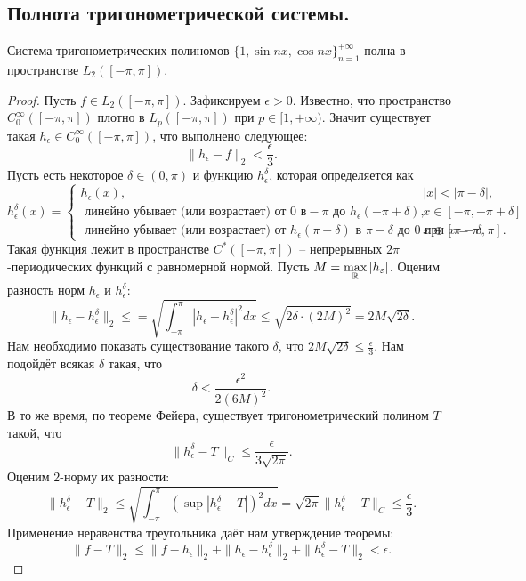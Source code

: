 \subsection{Полнота тригонометрической системы.}
\begin{theorem}
    Система тригонометрических полиномов $\{1, \sin nx, \cos nx\}_{n = 1}^{+\infty}$ полна в пространстве $L_2([-\pi, \pi])$.
\end{theorem}
\begin{proof}
    Пусть $f \in L_2([-\pi, \pi])$.
    Зафиксируем $\epsilon > 0$.
    Известно, что пространство $C_0^\infty([-\pi, \pi])$ плотно в $L_p([-\pi, \pi])$ при $p \in [1, +\infty)$.
    Значит существует такая $h_\epsilon \in C_0^\infty([-\pi, \pi])$, что выполнено следующее:
    \[
        \|h_\epsilon - f\|_2 < \frac{\epsilon}{3}.
    \]
    Пусть есть некоторое $\delta \in (0, \pi)$ и функцию $h_\epsilon^\delta$, которая определяется как
    \[
        h_{\epsilon}^{\delta}(x) =
        \begin{cases}
            h_{\epsilon}(x), & |x| < |\pi - \delta|, \\
            \text{ линейно убывает (или возрастает) от 0 в} -\pi \text{ до } h_\epsilon(-\pi + \delta), & x \in [-\pi, -\pi + \delta] \\
            \text{ линейно убывает (или возрастает) от } h_\epsilon(\pi - \delta) \text{ в } \pi - \delta \text{ до } 0 \text{ при } x = \pi, & x \in [\pi - \delta, \pi].
        \end{cases}
    \]
    Такая функция лежит в пространстве $C^*([-\pi, \pi])$ -- непрерывных $2\pi$-периодических функций с равномерной нормой.
    Пусть $M = \max\limits_{\mathbb{R}} |h_{\varepsilon}|$.
    Оценим разность норм $h_\epsilon$ и $h_\epsilon^\delta$:
    \[
        \|h_\epsilon - h_\epsilon^\delta\|_2 \leq = \sqrt {\int_{-\pi}^{\pi} |h_\epsilon - h_\epsilon^\delta|^2 dx} \leq \sqrt{2 \delta \cdot (2M)^2} = 2M\sqrt {2\delta}.
    \]
    Нам необходимо показать существование такого $\delta$, что $2M \sqrt {2\delta} \leq \frac{\epsilon}{3}$.
    Нам подойдёт всякая $\delta$ такая, что
    \[
        \delta < \frac{\epsilon^2}{2(6M)^2}.
    \]
    В то же время, по теореме Фейера, существует тригонометрический полином $T$ такой, что \[\|h_\epsilon^\delta - T\|_C \leq \frac{\epsilon}{3\sqrt {2\pi}}.\]
    Оценим $2$-норму их разности:
    \[
        \|h_\epsilon^\delta - T\|_2 \leq \sqrt {\int_{-\pi}^{\pi} (\sup|h_\epsilon^\delta - T|)^2dx} = \sqrt {2\pi}\|h_\epsilon^\delta - T\|_C \leq \dfrac{\epsilon}{3}.
    \]
    Применение неравенства треугольника даёт нам утверждение теоремы:
    \[
        \|f - T\|_2 \leq \|f - h_\epsilon\|_2 + \|h_\epsilon - h_\epsilon^\delta\|_2 + \|h_\epsilon^\delta - T\|_2 < \epsilon.
    \]
\end{proof}